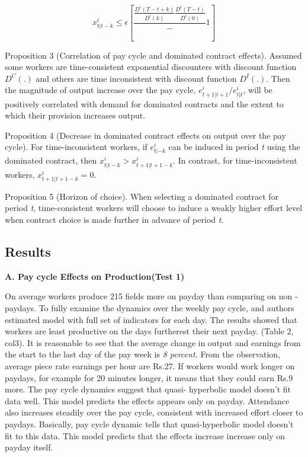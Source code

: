 \documentclass[a4paper,12pt]{article}
\begin{document}
\begin{equation}
x^i_{t|t-k} \leq \epsilon [\frac{\frac{D^i(T-t+k)}{D^i(k)} {\frac{D^i(T-t)}{D^i(0)}}} - 1]
\end{equation}


Proposition 3 (Correlation of pay cycle and dominated contract effects). 
Assumed some workers are time-consistent exponential discounters with discount function $D^C(.)$ and others are time inconsistent with discount function $D^I(.)$. Then the magnitude of output increase over the pay cycle, $e^i_{t+1|t+1}/e^i_{t|t}$, will be positively correlated with demand for dominated contracts and the extent to which their provision increases output. 


Proposition 4 (Decrease in dominated contract effects on output over the pay cycle). For time-inconsistent workers, if $e^i_{t|-k}$ can be induced in period \textit{t} using the dominated contract, then $x^i_{t|t-k} > x^i_{t+1|t+1-k}$. In contrast, for time-inconsistent workers, $x^i_{t+1|t+1-k}=0$. 


Proposition 5 (Horizon of choice). 
When selecting a dominated contract for period \textit{t}, time-consistent workers will choose to induce a weakly higher effort level when contract choice is made further in advance of period \textit{t}. 


\subsection{Results}


\textbf{A. Pay cycle Effects on Production(Test 1)}


On average workers produce 215 fields more on payday than comparing on non - paydays. To fully examine the dynamics over the weekly pay cycle, and authors estimated model with full set of indicators for each day. The results showed that workers are least productive on the days furtherest their next payday. (Table 2, col3). It is reasonable to see that the average change in output and earnings from the start to the last day of the pay week is \textit{8 percent.} From the observation, average piece rate earnings per hour are Rs.27. If workers would work longer on paydays, for example for 20 minutes longer, it means that they could earn Rs.9 more. The pay cycle dynamics suggest that quasi- hyperbolic model \cite{Laibson97} doesn't fit data well. This model predicts the effects appears only on payday. Attendance also increases steadily over the pay cycle, consistent with increased effort closer to paydays. Basically, pay cycle dynamic tells that quasi-hyperbolic model doesn't fit to this data. This model predicts that the effects increase increase only on payday itself. 
\end{document}
